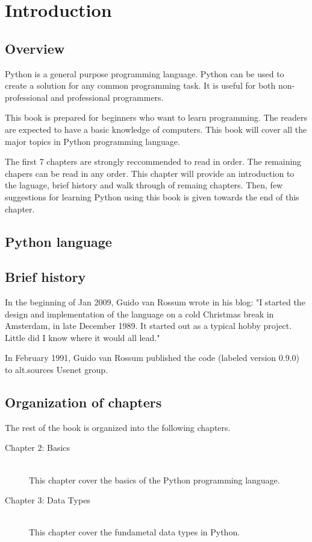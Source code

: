 \cleardoublepage
{}
\chapter{Introduction}

\section{Overview}

Python is a general purpose programming language.  Python can be used
to create a solution for any common programming task.  It is useful
for both non-professional and professional programmers.

This book is prepared for beginners who want to learn programming.
The readers are expected to have a basic knowledge of computers.  This
book will cover all the major topics in Python programming language.

The first 7 chapters are strongly reccommended to read in order.  The
remaining chapers can be read in any order.  This chapter will provide
an introduction to the laguage, brief history and walk through of
remaing chapters.  Then, few suggestions for learning Python using
this book is given towards the end of this chapter.

\section{Python language}

\section{Brief history}

In the beginning of Jan 2009, Guido van Rossum wrote in his blog: "I
started the design and implementation of the language on a cold
Christmas break in Amsterdam, in late December 1989.  It started out
as a typical hobby project.  Little did I know where it would all
lead."

In February 1991, Guido van Rossum published the code (labeled version
0.9.0) to alt.sources Usenet group.

\section{Organization of chapters}

The rest of the book is organized into the following chapters.

\begin{description}
\item[Chapter 2: Basics] \hfill \\
This chapter cover the basics of the Python programming language.
\item[Chapter 3: Data Types] \hfill \\
This chapter cover the fundametal data types in Python.
\end{description}

